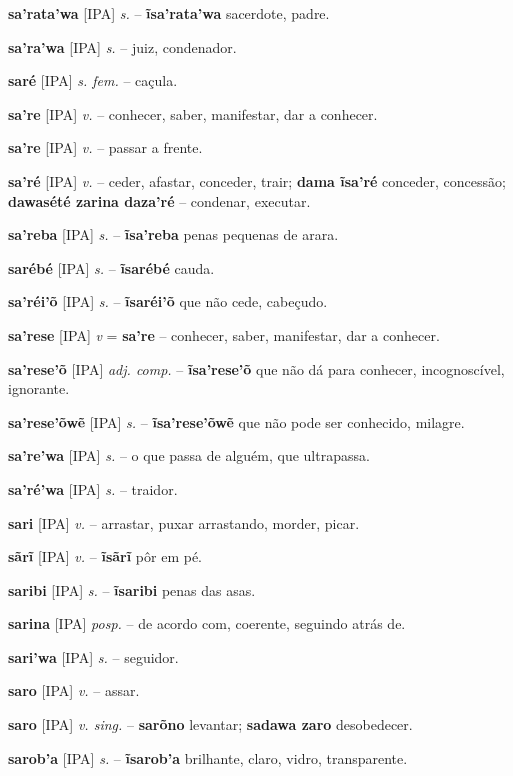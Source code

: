 \textbf{sa'rata'wa} [IPA] \textit{s.} -- \textbf{ĩsa'rata'wa} sacerdote, padre.

\textbf{sa'ra'wa} [IPA] \textit{s.} -- juiz, condenador.

\textbf{saré} [IPA] \textit{s. fem.} -- caçula.

\textbf{sa're} [IPA] \textit{v.} -- conhecer, saber, manifestar, dar a conhecer.

\textbf{sa're} [IPA] \textit{v.} -- passar a frente.

\textbf{sa'ré} [IPA] \textit{v.} -- ceder, afastar, conceder, trair; \textbf{dama ĩsa'ré} conceder, concessão; \textbf{dawasété zarina daza'ré} -- condenar, executar.

\textbf{sa'reba} [IPA] \textit{s.} -- \textbf{ĩsa'reba} penas pequenas de arara.

\textbf{sarébé} [IPA] \textit{s.} -- \textbf{ĩsarébé} cauda.

\textbf{sa'réi'õ} [IPA] \textit{s.} -- \textbf{ĩsaréi'õ} que não cede, cabeçudo.

\textbf{sa'rese} [IPA] \textit{v} = \textbf{sa're} -- conhecer, saber, manifestar, dar a conhecer.

\textbf{sa'rese'õ} [IPA] \textit{adj. comp.} -- \textbf{ĩsa'rese'õ} que não dá para conhecer, incognoscível, ignorante.

\textbf{sa'rese'õwẽ} [IPA] \textit{s.} -- \textbf{ĩsa'rese'õwẽ} que não pode ser conhecido, milagre.

\textbf{sa're'wa} [IPA] \textit{s.} -- o que passa de alguém, que ultrapassa.

\textbf{sa'ré'wa} [IPA] \textit{s.} -- traidor.

\textbf{sari} [IPA] \textit{v.} -- arrastar, puxar arrastando, morder, picar.

\textbf{sãrĩ} [IPA] \textit{v.} -- \textbf{ĩsãrĩ} pôr em pé.

\textbf{saribi} [IPA] \textit{s.} -- \textbf{ĩsaribi} penas das asas.

\textbf{sarina} [IPA] \textit{posp.} -- de acordo com, coerente, seguindo atrás de.

\textbf{sari'wa} [IPA] \textit{s.} -- seguidor.

\textbf{saro} [IPA] \textit{v.} -- assar.

\textbf{saro} [IPA] \textit{v. sing.} -- \textbf{sarõno} levantar; \textbf{sadawa zaro} desobedecer.

\textbf{sarob'a} [IPA] \textit{s.} -- \textbf{ĩsarob'a} brilhante, claro, vidro, transparente.

